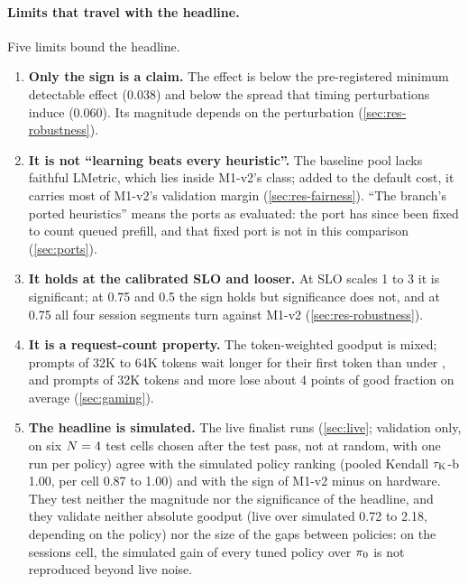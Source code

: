 \paragraph{Limits that travel with the headline.}
Five limits bound the headline.
\begin{enumerate}
  \item \textbf{Only the sign is a claim.} The effect is below the pre-registered minimum detectable
    effect (0.038) and below the spread that timing perturbations induce (0.060). Its magnitude
    depends on the perturbation (\cref{sec:res-robustness}).
  \item \textbf{It is not ``learning beats every heuristic''.} The baseline pool lacks faithful
    LMetric, which lies inside M1-v2's class; added to the default cost, it carries most of M1-v2's
    validation margin (\cref{sec:res-fairness}). ``The branch's ported heuristics'' means the ports as
    evaluated: the  port has since been fixed to count queued prefill, and that fixed
    port is not in this comparison (\cref{sec:ports}).
  \item \textbf{It holds at the calibrated SLO and looser.} At SLO scales 1 to 3 it is significant;
    at 0.75 and 0.5 the sign holds but significance does not, and at 0.75 all four session segments
    turn against M1-v2 (\cref{sec:res-robustness}).
  \item \textbf{It is a request-count property.} The token-weighted goodput is mixed; prompts of
    32K to 64K tokens wait longer for their first token than under , and prompts of
    32K tokens and more lose about 4 points of good fraction on average (\cref{sec:gaming}).
  \item \textbf{The headline is simulated.} The live finalist runs (\cref{sec:live}; validation only,
    on six $N = 4$ test cells chosen after the test pass, not at random, with one run per policy)
    agree with the simulated policy ranking (pooled Kendall $\tau_{\mathrm{K}}$-b 1.00, per cell 0.87 to 1.00)
    and with the sign of M1-v2 minus  on hardware. They test neither the magnitude nor
    the significance of the headline, and they validate neither absolute goodput (live over simulated
    0.72 to 2.18, depending on the policy) nor the size of the gaps between policies: on the sessions
    cell, the simulated gain of every tuned policy over $\pi_{0}$ is not reproduced beyond live noise.
\end{enumerate}

